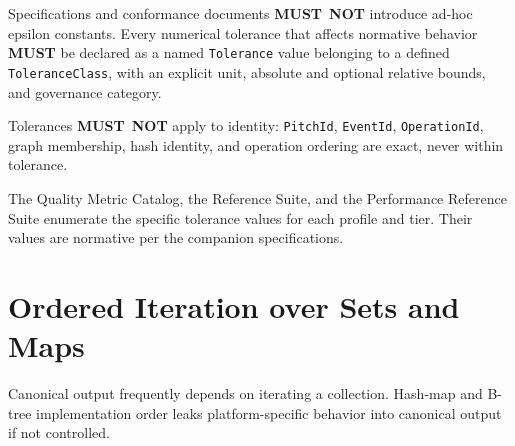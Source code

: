 \documentclass[11pt,letterpaper]{report}
\newcounter{requirement}[chapter]
\newcommand{\MUST}{\textbf{MUST}}
\newcommand{\MUSTNOT}{\textbf{MUST}\nobreak\ \textbf{NOT}}
\begin{document}
\begin{requirement}
  \label{req:determinism:named-tolerances}
  Specifications and conformance documents \MUSTNOT{} introduce
  ad-hoc epsilon constants. Every numerical tolerance that
  affects normative behavior \MUST{} be declared as a named
  \texttt{Tolerance} value belonging to a defined
  \texttt{ToleranceClass}, with an explicit unit, absolute and
  optional relative bounds, and governance category.

  Tolerances \MUSTNOT{} apply to identity: \texttt{PitchId},
  \texttt{EventId}, \texttt{OperationId}, graph membership,
  hash identity, and operation ordering are exact, never within
  tolerance.

  The Quality Metric Catalog, the Reference Suite, and the
  Performance Reference Suite enumerate the specific tolerance
  values for each profile and tier. Their values are normative
  per the companion specifications.
\end{requirement}

\section{Ordered Iteration over Sets and Maps}
\label{sec:det:ordering}

Canonical output frequently depends on iterating a collection.
Hash-map and B-tree implementation order leaks platform-specific
behavior into canonical output if not controlled.
\end{document}
